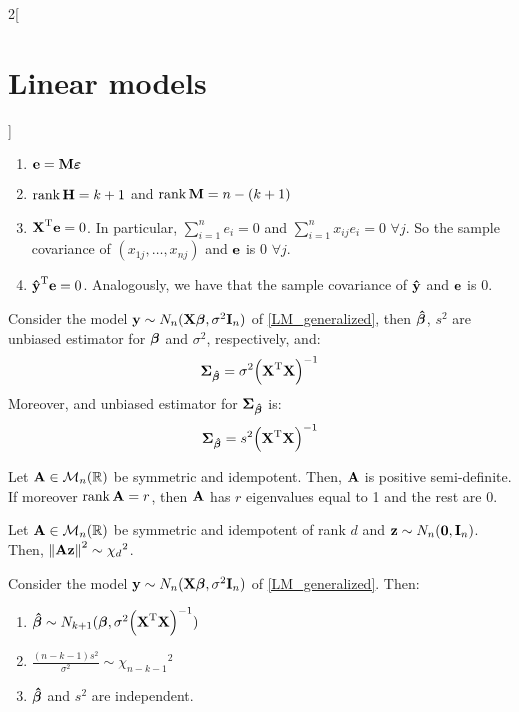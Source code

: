 \documentclass[../../../main_math.tex]{subfiles}
\begin{document}
\begin{multicols}{2}[\section{Linear models}]
\begin{proposition}
\begin{enumerate}
      \item $\boldsymbol{\mathrm{e}}=\boldsymbol{\mathrm{M\varepsilon}}$
      \item $\rank \boldsymbol{\mathrm{H}}=k+1$ and $\rank \boldsymbol{\mathrm{M}}=n-(k+1)$
      \item ${\boldsymbol{\mathrm{X}}}^{\mathrm{T}}\boldsymbol{\mathrm{e}}=0$. In particular, $\sum_{i=1}^n e_i=0$ and $\sum_{i=1}^n x_{ij}e_i=0$ $\forall j$. So the sample covariance of $(x_{1j},\ldots,x_{nj})$ and $\boldsymbol{\mathrm{e}}$ is 0 $\forall j$.
      \item ${\boldsymbol{\mathrm{\hat{y}}}}^{\mathrm{T}}\boldsymbol{\mathrm{e}}=0$. Analogously, we have that the sample covariance of $\boldsymbol{\mathrm{\hat{y}}}$ and $\boldsymbol{\mathrm{e}}$ is 0.
    \end{enumerate}
  \end{proposition}
  \begin{proposition}
    Consider the model $\boldsymbol{\mathrm{y}}\sim N_n(\boldsymbol{\mathrm{X\beta}},\sigma^2\boldsymbol{\mathrm{I}}_n)$ of \cref{LM_generalized}, then $\boldsymbol{\mathrm{\hat\beta}}$, $s^2$ are unbiased estimator for $\boldsymbol{\mathrm{\beta}}$ and $\sigma^2$, respectively, and: $$\boldsymbol{\mathrm{\Sigma}}_{\boldsymbol{\mathrm{\hat\beta}}}=\sigma^2{\left({\boldsymbol{\mathrm{X}}}^{\mathrm{T}}\boldsymbol{\mathrm{X}}\right)}^{-1}$$
    Moreover, and unbiased estimator for $\boldsymbol{\mathrm{\Sigma}}_{\boldsymbol{\mathrm{\hat\beta}}}$ is: $$\boldsymbol{\mathrm{\Sigma}}_{\boldsymbol{\mathrm{\hat\beta}}}=s^2{\left({\boldsymbol{\mathrm{X}}}^{\mathrm{T}}\boldsymbol{\mathrm{X}}\right)}^{-1}$$
  \end{proposition}
  \begin{proposition}
    Let $\boldsymbol{\mathrm{A}}\in\mathcal{M}_n(\mathbb{R})$ be symmetric and idempotent. Then, $\boldsymbol{\mathrm{A}}$ is positive semi-definite. If moreover $\rank\boldsymbol{\mathrm{A}} =r$, then $\boldsymbol{\mathrm{A}}$ has $r$ eigenvalues equal to 1 and the rest are 0.
  \end{proposition}
  \begin{lemma}
    Let $\boldsymbol{\mathrm{A}}\in\mathcal{M}_n(\mathbb{R})$ be symmetric and idempotent of rank $d$ and $\boldsymbol{\mathrm{z}}\sim N_n(\boldsymbol{\mathrm{0}},\boldsymbol{\mathrm{I}}_n)$. Then, $\left\|\boldsymbol{\mathrm{Az}}\right\|^2\sim{\chi_d}^2$.
  \end{lemma}
  \begin{proposition}
    Consider the model $\boldsymbol{\mathrm{y}}\sim N_n(\boldsymbol{\mathrm{X\beta}},\sigma^2\boldsymbol{\mathrm{I}}_n)$ of \cref{LM_generalized}. Then:
    \begin{enumerate}
      \item $\boldsymbol{\mathrm{\hat\beta}}\sim N_{k+1}(\boldsymbol{\mathrm{\beta}},\sigma^2{\left({\boldsymbol{\mathrm{X}}}^{\mathrm{T}}\boldsymbol{\mathrm{X}}\right)}^{-1})$
      \item $\frac{(n-k-1)s^2}{\sigma^2}\sim{\chi_{n-k-1}}^2$
      \item $\boldsymbol{\mathrm{\hat\beta}}$ and $s^2$ are independent.
    \end{enumerate}
  \end{proposition}
  \begin{proposition}

\end{proposition}
\end{multicols}
\end{document}
